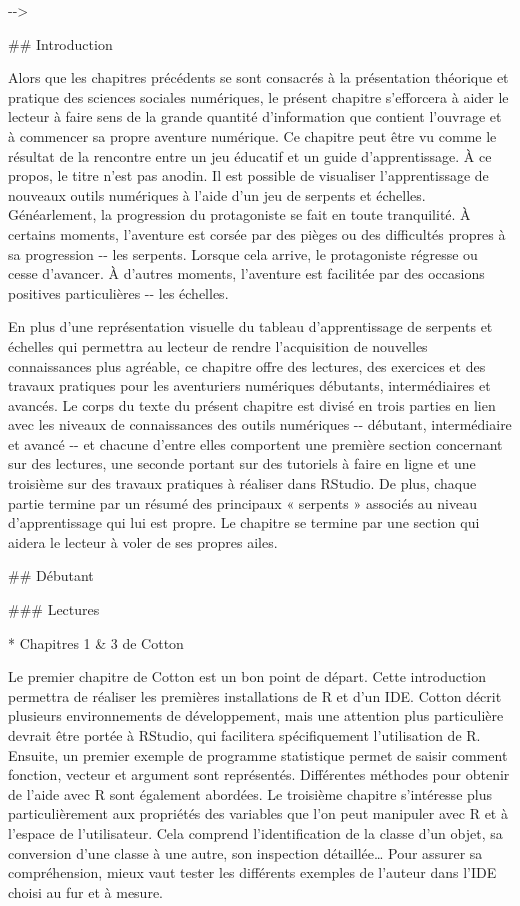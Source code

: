 \documentclass[
  letterpaper,
]{scrbook}
\begin{document}
-\/-\textgreater{}

\#\# Introduction

Alors que les chapitres précédents se sont consacrés à la présentation
théorique et pratique des sciences sociales numériques, le présent
chapitre s'efforcera à aider le lecteur à faire sens de la grande
quantité d'information que contient l'ouvrage et à commencer sa propre
aventure numérique. Ce chapitre peut être vu comme le résultat de la
rencontre entre un jeu éducatif et un guide d'apprentissage. À ce
propos, le titre n'est pas anodin. Il est possible de visualiser
l'apprentissage de nouveaux outils numériques à l'aide d'un jeu de
serpents et échelles. Généarlement, la progression du protagoniste se
fait en toute tranquilité. À certains moments, l'aventure est corsée par
des pièges ou des difficultés propres à sa progression -\/- les
serpents. Lorsque cela arrive, le protagoniste régresse ou cesse
d'avancer. À d'autres moments, l'aventure est facilitée par des
occasions positives particulières -\/- les échelles.

En plus d'une représentation visuelle du tableau d'apprentissage de
serpents et échelles qui permettra au lecteur de rendre l'acquisition de
nouvelles connaissances plus agréable, ce chapitre offre des lectures,
des exercices et des travaux pratiques pour les aventuriers numériques
débutants, intermédiaires et avancés. Le corps du texte du présent
chapitre est divisé en trois parties en lien avec les niveaux de
connaissances des outils numériques -\/- débutant, intermédiaire et
avancé -\/- et chacune d'entre elles comportent une première section
concernant sur des lectures, une seconde portant sur des tutoriels à
faire en ligne et une troisième sur des travaux pratiques à réaliser
dans RStudio. De plus, chaque partie termine par un résumé des
principaux « serpents » associés au niveau d'apprentissage qui lui est
propre. Le chapitre se termine par une section qui aidera le lecteur à
voler de ses propres ailes.

\#\# Débutant

\#\#\# Lectures

* Chapitres 1 \& 3 de Cotton

Le premier chapitre de Cotton est un bon point de départ. Cette
introduction permettra de réaliser les premières installations de R et
d'un IDE. Cotton décrit plusieurs environnements de développement, mais
une attention plus particulière devrait être portée à RStudio, qui
facilitera spécifiquement l'utilisation de R. Ensuite, un premier
exemple de programme statistique permet de saisir comment fonction,
vecteur et argument sont représentés. Différentes méthodes pour obtenir
de l'aide avec R sont également abordées. Le troisième chapitre
s'intéresse plus particulièrement aux propriétés des variables que l'on
peut manipuler avec R et à l'espace de l'utilisateur. Cela comprend
l'identification de la classe d'un objet, sa conversion d'une classe à
une autre, son inspection détaillée\ldots{} Pour assurer sa
compréhension, mieux vaut tester les différents exemples de l'auteur
dans l'IDE choisi au fur et à mesure.
\end{document}
